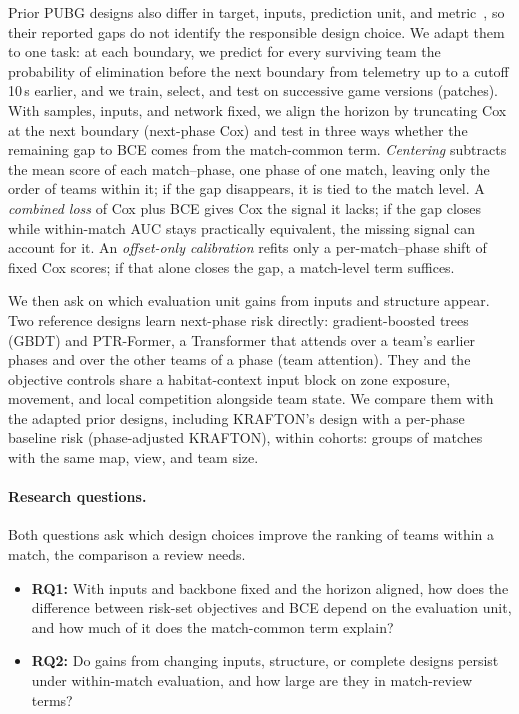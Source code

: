 \documentclass[sigconf,anonymous]{acmart}
\begin{document}
Prior PUBG designs also differ in target, inputs, prediction unit, and metric~\cite{Sagong25a,KRAFTON}, so their reported gaps do not identify the responsible design choice. We adapt them to one task: at each boundary, we predict for every surviving team the probability of elimination before the next boundary from telemetry up to a cutoff 10\,s earlier, and we train, select, and test on successive game versions (patches). With samples, inputs, and network fixed, we align the horizon by truncating Cox at the next boundary (next-phase Cox) and test in three ways whether the remaining gap to BCE comes from the match-common term. \emph{Centering} subtracts the mean score of each match--phase, one phase of one match, leaving only the order of teams within it; if the gap disappears, it is tied to the match level. A \emph{combined loss} of Cox plus BCE gives Cox the signal it lacks; if the gap closes while within-match AUC stays practically equivalent, the missing signal can account for it. An \emph{offset-only calibration} refits only a per-match--phase shift of fixed Cox scores; if that alone closes the gap, a match-level term suffices.

We then ask on which evaluation unit gains from inputs and structure appear. Two reference designs learn next-phase risk directly: gradient-boosted trees (GBDT) and PTR-Former, a Transformer that attends over a team's earlier phases and over the other teams of a phase (team attention). They and the objective controls share a habitat-context input block on zone exposure, movement, and local competition alongside team state. We compare them with the adapted prior designs, including KRAFTON's design with a per-phase baseline risk (phase-adjusted KRAFTON), within cohorts: groups of matches with the same map, view, and team size.

\paragraph{Research questions.} Both questions ask which design choices improve the ranking of teams within a match, the comparison a review needs.
\begin{itemize}
\item \textbf{RQ1:} With inputs and backbone fixed and the horizon aligned, how does the difference between risk-set objectives and BCE depend on the evaluation unit, and how much of it does the match-common term explain?
\item \textbf{RQ2:} Do gains from changing inputs, structure, or complete designs persist under within-match evaluation, and how large are they in match-review terms?
\end{itemize}
\end{document}
